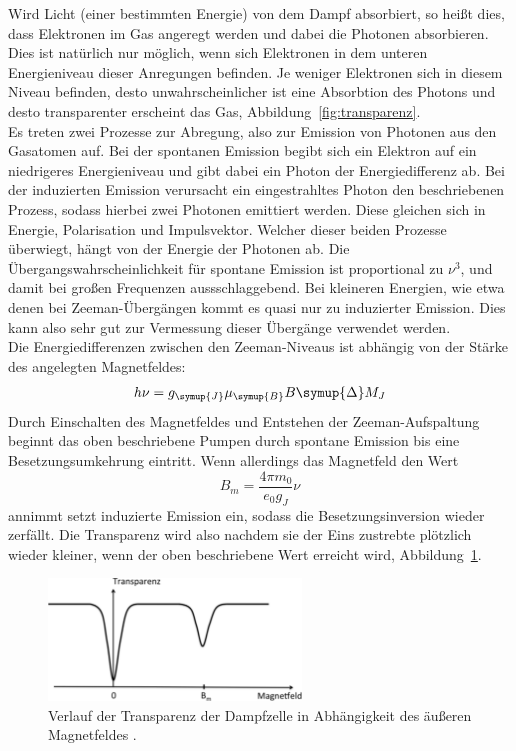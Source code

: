 Wird Licht (einer bestimmten Energie) von dem Dampf absorbiert, so heißt dies,
dass Elektronen im Gas angeregt werden und dabei die Photonen absorbieren. Dies
ist natürlich nur möglich, wenn sich Elektronen in dem unteren Energieniveau
dieser Anregungen befinden. Je weniger Elektronen sich in diesem Niveau
befinden, desto unwahrscheinlicher ist eine Absorbtion des Photons und desto
transparenter erscheint das Gas, Abbildung~\ref{fig:transparenz}. \\
Es treten zwei Prozesse zur Abregung, also zur Emission von Photonen aus den
Gasatomen auf. Bei der spontanen Emission begibt sich ein Elektron auf
ein niedrigeres Energieniveau und gibt dabei ein Photon der Energiedifferenz
ab. Bei der induzierten Emission verursacht ein eingestrahltes Photon
den beschriebenen Prozess, sodass hierbei zwei Photonen emittiert werden. Diese
gleichen sich in Energie, Polarisation und Impulsvektor. Welcher dieser beiden
Prozesse überwiegt, hängt von der Energie der Photonen ab. Die
Übergangswahrscheinlichkeit für spontane Emission ist proportional zu $\nu^3$,
und damit bei großen Frequenzen aussschlaggebend. Bei kleineren Energien, wie
etwa denen bei Zeeman-Übergängen kommt es quasi nur zu induzierter Emission.
Dies kann also sehr gut zur Vermessung dieser Übergänge verwendet werden. \\
Die Energiedifferenzen zwischen den Zeeman-Niveaus ist abhängig von der Stärke
des angelegten Magnetfeldes:
%
\begin{equation}
  h\nu=g_{\symup{J}}\mu_{\symup{B}}B\symup{\Delta}M_J
  \label{eq:übergangsenergie}
\end{equation}
%
Durch Einschalten des Magnetfeldes und Entstehen der Zeeman-Aufspaltung beginnt
das oben beschriebene Pumpen durch spontane Emission bis eine
Besetzungsumkehrung eintritt. Wenn allerdings das Magnetfeld den Wert
%
\begin{equation}
  B_m=\frac{4\pi m_0}{e_0g_J}\nu
\end{equation}
%
annimmt setzt induzierte Emission ein, sodass die Besetzungsinversion wieder
zerfällt. Die Transparenz wird also nachdem sie der Eins zustrebte plötzlich
wieder kleiner, wenn der oben beschriebene Wert erreicht wird, Abbildung~\ref{fig:transparenz_b}.
%
\begin{figure}[htb]
  \centering
  \includegraphics[width=0.6\textwidth]{figures/transparenzkurve.pdf}
  \caption{Verlauf der Transparenz der Dampfzelle in Abhängigkeit des äußeren Magnetfeldes \cite{V21}.}
  \label{fig:transparenz_b}
\end{figure}
%


